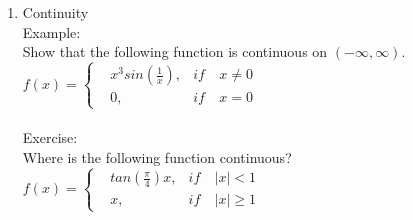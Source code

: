 \documentclass[12px]{article}
\begin{document}
\begin{enumerate}
\begin{enumerate}[(1)]
        \item Continuity\\
        Example:\\
        Show that the following function is continuous on $(-\infty, \infty)$.
        \begin{equation}
            f(x)=\left\{
            \begin{aligned}
                    &x^3sin(\frac{1}{x}), &if&\ x\neq 0\\
                    &0, &if&\ x=0\hspace{32em}         
                \end{aligned}    
            \right.\nonumber
        \end{equation}\\
        Exercise:\\
        Where is the following function continuous?
        \begin{equation}
            f(x)=\left\{
            \begin{aligned}
                    &tan(\frac{\pi}{4})x, &if&\ \left | x\right |<1\\
                    &x, &if&\ \left | x\right |\geqslant 1\hspace{32em}         
                \end{aligned}    
            \right.\nonumber
        \end{equation}\\


\end{enumerate}
\end{enumerate}
\end{document}
